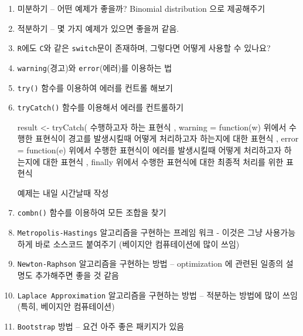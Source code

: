 \documentclass{article}
\begin{document}
\begin{enumerate}
	
\item 미분하기 -- 어떤 예제가 좋을까? Binomial distribution 으로 제공해주기 

\item 적분하기 -- 몇 가지 예제가 있으면 좋을꺼 같음.

\item \texttt{R}에도 \texttt{C}와 같은 \texttt{switch}문이 존재하며, 그렇다면 어떻게 사용할 수 있나요? 

\item \texttt{warning}(경고)와 \texttt{error}(에러)를 이용하는 법

\item \texttt{try()} 함수를 이용하여 에러를 컨트롤 해보기

\item \texttt{tryCatch()} 함수를 이용해서 에러를 컨트롤하기

\begin{Schunk}
\begin{Soutput}
result <- tryCatch(
{
	수행하고자 하는 표현식
},
warning = function(w) {
	위에서 수행한 표현식이 경고를 발생시킬때 어떻게 처리하고자 하는지에 대한 표현식
},
error = function(e) {
	위에서 수행한 표현식이 에러를 발생시킬때 어떻게 처리하고자 하는지에 대한 표현식
}, finally {
	위에서 수행한 표현식에 대한 최종적 처리를 위한 표현식
}
\end{Soutput}
\end{Schunk}

예제는 내일 시간날때 작성
\item \texttt{combn()} 함수를 이용하여 모든 조합을 찾기

\item \texttt{Metropolis-Hastings} 알고리즘을 구현하는 프레임 워크 - 이것은 그냥 사용가능하게 바로 소스코드 붙여주기 (베이지안 컴퓨테이션에 많이 쓰임)

\item \texttt{Newton-Raphson} 알고리즘을 구현하는 방법 -- optimization 에 관련된 일종의 설명도 추가해주면 좋을 것 같음 

\item \texttt{Laplace Approximation} 알고리즘을 구현하는 방법 -- 적분하는 방법에 많이 쓰임 (특히, 베이지안 컴퓨테이션) 

\item \texttt{Bootstrap} 방법 -- 요건 아주 좋은 패키지가 있음 
\end{enumerate}
\end{document}
